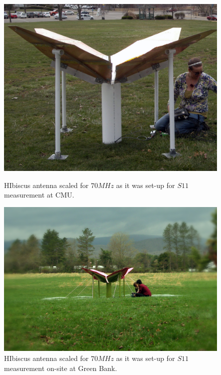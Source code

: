 \begin{figure}[htb]
\centering
\begin{minipage}[b]{0.44\textwidth}
\centering
\includegraphics[width=0.95\linewidth]{SCIHI_system/figures/HIbiscus_pgh_imp.jpg}
\caption{HIbiscus antenna scaled for $70 MHz$ as it was set-up for $S11$ measurement at CMU. }
\label{Fig:hibiscus_first}
\end{minipage}%
\begin{minipage}[b]{0.02\textwidth}
\hspace{1cm}
\end{minipage}%
\begin{minipage}[b]{0.51\textwidth}
\centering
\includegraphics[width=0.95\linewidth]{SCIHI_system/figures/HIbiscus_gbt.jpg}
\caption{HIbiscus antenna scaled for $70 MHz$ as it was set-up for $S11$ measurement on-site at Green Bank.}
\label{Fig:hibiscus_gbt}
\end{minipage}
\end{figure}


